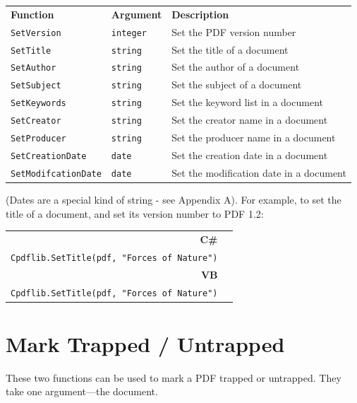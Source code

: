 \documentclass[a4paper]{memoir}
\begin{document}
\begin{framed}
\noindent\begin{tabular}{lll}
\textbf{Function} & \textbf{Argument} & \textbf{Description}\\
\verb!SetVersion! & \verb!integer! & Set the PDF version number\\
\verb!SetTitle! & \verb!string! & Set the title of a document\\
\verb!SetAuthor! & \verb!string! & Set the author of a document\\
\verb!SetSubject! & \verb!string! & Set the subject of a document\\
\verb!SetKeywords! & \verb!string! & Set the keyword list in a document\\
\verb!SetCreator! & \verb!string! & Set the creator name in a document\\
\verb!SetProducer! & \verb!string! & Set the producer name in a document\\
\verb!SetCreationDate! & \verb!date! & Set the creation date in a document\\
\verb!SetModifcationDate! & \verb!date! & Set the modification date in a document
\end{tabular}
\end{framed}
\noindent(Dates are a special kind of string - see Appendix A). For example, to set the title of a document, and set its version number to PDF 1.2:
\begin{framed}
\noindent\begin{tabular}{rl}
\small\sffamily\textbf{C\#} &
\begin{minipage}{4in}
\small\verb!Cpdflib.SetVersion(pdf, 2)!\\
\verb!Cpdflib.SetTitle(pdf, "Forces of Nature")!
\end{minipage}\\[5mm]
\small\sffamily\textbf{VB} &
\begin{minipage}{4in}
\small\verb!Cpdflib.SetVersion(pdf, 2)!\\
\verb!Cpdflib.SetTitle(pdf, "Forces of Nature")!
\end{minipage}\\[5mm]
\end{tabular}
\end{framed}


\section{Mark Trapped / Untrapped}
These two functions can be used to mark a PDF trapped or untrapped. They take one argument---the document.
\end{document}
